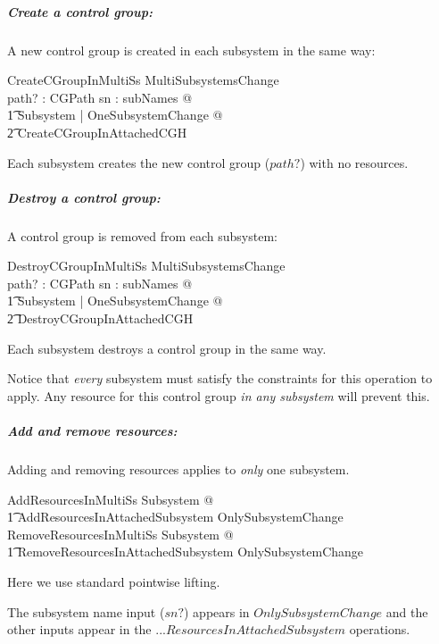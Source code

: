 \documentclass[a4paper,twoside,12pt]{article}
\begin{document}
\subparagraph{Create a control group:}

A new control group is created in each subsystem in the same way:

\begin{schema}{CreateCGroupInMultiSs}
MultiSubsystemsChange \\
path? : CGPath
\where
\forall sn : subNames @ \\
\t1 \exists \Delta Subsystem | OneSubsystemChange @ \\
    \t2 CreateCGroupInAttachedCGH
\end{schema}
Each subsystem creates the new control group ($path?$) with no resources.

\subparagraph{Destroy a control group:}

A control group is removed from each subsystem:

\begin{schema}{DestroyCGroupInMultiSs}
MultiSubsystemsChange \\
path? : CGPath
\where
\forall sn : subNames @ \\
\t1 \exists \Delta Subsystem | OneSubsystemChange @ \\
    \t2 DestroyCGroupInAttachedCGH
\end{schema}
Each subsystem destroys a control group in the same way.

Notice that \emph{every} subsystem must satisfy the constraints for this operation to apply.
Any resource for this control group \emph{in any subsystem} will prevent this.

\subparagraph{Add and remove resources:}

Adding and removing resources applies to \emph{only} one subsystem.

\begin{zed}
AddResourcesInMultiSs   \exists \Delta Subsystem @ \\
    \t1 AddResourcesInAttachedSubsystem \land OnlySubsystemChange
\also
RemoveResourcesInMultiSs   \exists \Delta Subsystem @ \\
    \t1 RemoveResourcesInAttachedSubsystem \land OnlySubsystemChange
\end{zed}
Here we use standard pointwise lifting.

The subsystem name input ($sn?$) appears in $OnlySubsystemChange$
and the other inputs appear in the ...$ResourcesInAttachedSubsystem$ operations.
\end{document}
